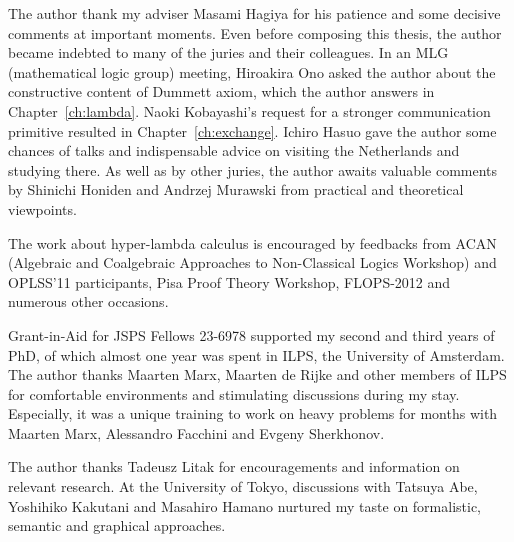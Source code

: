 \begin{acknowledge}
 The author thank my adviser Masami Hagiya for his patience and some decisive
 comments at important moments.
 Even before composing this thesis, the author became indebted to many of the
 juries and their colleagues.
 In an MLG (mathematical logic group) meeting, Hiroakira Ono asked the author
 about the constructive content of Dummett axiom, which the author answers in
 Chapter~\ref{ch:lambda}.
 Naoki Kobayashi's request for a stronger communication primitive
 resulted in Chapter~\ref{ch:exchange}.
 Ichiro Hasuo gave the author some chances of talks and
 indispensable advice on visiting the Netherlands
 and studying there.
 As well as by other juries,
 the author awaits valuable comments by Shinichi Honiden and Andrzej Murawski from
 practical and theoretical viewpoints.

 The work about hyper-lambda calculus is encouraged by feedbacks from
 ACAN (Algebraic and Coalgebraic Approaches to
 Non-Classical Logics Workshop) and OPLSS'11 participants,
 Pisa Proof Theory Workshop, FLOPS-2012
 and numerous other occasions.

 Grant-in-Aid for JSPS Fellows 23-6978 supported
 my second and third years of PhD, of which almost one year was spent
 in ILPS, the University of Amsterdam.
 The author thanks Maarten Marx, Maarten de Rijke and other members of ILPS for
 comfortable environments and stimulating discussions during my stay.
 Especially, it was a unique training to work on heavy problems for months with Maarten Marx, Alessandro
 Facchini and Evgeny Sherkhonov.

 The author thanks Tadeusz Litak for encouragements and
 information on relevant research.
 At the University of Tokyo,
 discussions with Tatsuya Abe, Yoshihiko Kakutani and Masahiro Hamano
 nurtured my taste on formalistic, semantic and graphical approaches.
\end{acknowledge}
